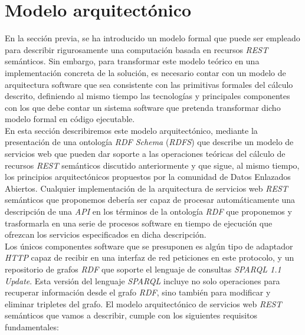 \section{Modelo arquitect\'onico}

En la secci\'on previa, se ha introducido un modelo formal que puede ser empleado para describir rigurosamente una computaci\'on basada en recursos \textit{REST} sem\'anticos.
Sin embargo, para transformar este modelo te\'orico en una implementaci\'on concreta de la soluci\'on, es necesario contar con un modelo de arquitectura software que sea consistente con las primitivas formales del c\'alculo descrito, definiendo al mismo tiempo las tecnolog\'ias y principales componentes con los que debe contar un sistema software que pretenda transformar dicho modelo formal en c\'odigo ejecutable.\\
En esta secci\'on describiremos este modelo arquitect\'onico, mediante la presentaci\'on de una ontolog\'ia \textit{RDF Schema} (\textit{RDFS}) que describe un modelo de servicios web que pueden dar soporte a las operaciones te\'oricas del c\'alculo de recursos \textit{REST} sem\'anticos discutido anteriormente y que sigue, al mismo tiempo, los principios arquitect\'onicos propuestos por la comunidad de Datos Enlazados Abiertos. Cualquier implementaci\'on de la arquitectura de servicios web \textit{REST} sem\'anticos que proponemos deber\'ia ser capaz de procesar autom\'aticamente una descripci\'on de una \textit{API} en los t\'erminos de la ontolog\'ia \textit{RDF} que proponemos y trasformarla en una serie de procesos software en tiempo de ejecuci\'on que ofrezcan los servicios especificados en dicha descripci\'on.\\
Los \'unicos componentes software que se presuponen es alg\'un tipo de adaptador \textit{HTTP} capaz de recibir en una interfaz de red peticiones en este protocolo, y un repositorio de grafos \textit{RDF} que soporte el lenguaje de consultas \textit{SPARQL 1.1 Update}. Esta versi\'on del lenguaje \textit{SPARQL} incluye no solo operaciones para recuperar informaci\'on desde el grafo \textit{RDF}, sino tambi\'en para modificar y eliminar tripletes del grafo.
El modelo arquitect\'onico de servicios web \textit{REST} sem\'anticos que vamos a describir, cumple con los siguientes requisitos fundamentales:

